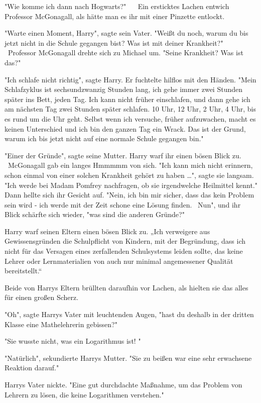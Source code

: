{"Wie komme ich dann nach Hogwarts?" ~ ~Ein ersticktes Lachen entwich Professor McGonagall, als hätte man es ihr mit einer Pinzette entlockt. ~ ~

"Warte einen Moment, Harry", sagte sein Vater. "Weißt du noch, warum du bis jetzt nicht in die Schule gegangen bist? Was ist mit deiner Krankheit?" ~ ~Professor McGonagall drehte sich zu Michael um. "Seine Krankheit? Was ist das?" ~ ~

"Ich schlafe nicht richtig", sagte Harry. Er fuchtelte hilflos mit den Händen. "Mein Schlafzyklus ist sechsundzwanzig Stunden lang, ich gehe immer zwei Stunden später ins Bett, jeden Tag. Ich kann nicht früher einschlafen, und dann gehe ich am nächsten Tag zwei Stunden später schlafen. 10 Uhr, 12 Uhr, 2 Uhr, 4 Uhr, bis es rund um die Uhr geht. Selbst wenn ich versuche, früher aufzuwachen, macht es keinen Unterschied und ich bin den ganzen Tag ein Wrack. Das ist der Grund, warum ich bis jetzt nicht auf eine normale Schule gegangen bin." ~ ~

"Einer der Gründe", sagte seine Mutter. Harry warf ihr einen bösen Blick zu. ~ ~McGonagall gab ein langes Hmmmmm von sich. "Ich kann mich nicht erinnern, schon einmal von einer solchen Krankheit gehört zu haben …", sagte sie langsam. "Ich werde bei Madam Pomfrey nachfragen, ob sie irgendwelche Heilmittel kennt." Dann hellte sich ihr Gesicht auf. "Nein, ich bin mir sicher, dass das kein Problem sein wird - ich werde mit der Zeit schone eine Lösung finden. ~Nun", und ihr Blick schärfte sich wieder, "was sind die anderen Gründe?" ~ ~

Harry warf seinen Eltern einen bösen Blick zu. „Ich verweigere aus Gewissensgründen die Schulpflicht von Kindern, mit der Begründung, dass ich nicht für das Versagen eines zerfallenden Schulsystems leiden sollte, das keine Lehrer oder Lernmaterialien von auch nur minimal angemessener Qualität bereitstellt.“ ~ ~

Beide von Harrys Eltern brüllten daraufhin vor Lachen, als hielten sie das alles für einen großen Scherz.

"Oh", sagte Harrys Vater mit leuchtenden Augen, "hast du deshalb in der dritten Klasse eine Mathelehrerin gebissen?" ~ ~

"Sie wusste nicht, was ein Logarithmus ist! "

"Natürlich", sekundierte Harrys Mutter. "Sie zu beißen war eine sehr erwachsene Reaktion darauf." ~ ~

Harrys Vater nickte. "Eine gut durchdachte Maßnahme, um das Problem von Lehrern zu lösen, die keine Logarithmen verstehen." ~ ~

}
